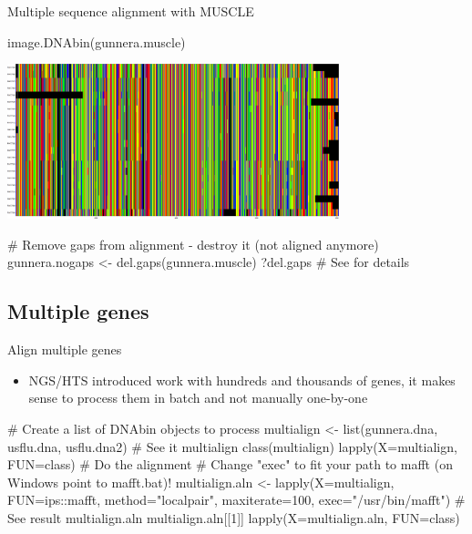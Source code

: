 \documentclass[compress, xelatex, 11pt, xcolor=svgnames, aspectratio=169,
	hyperref={
		bookmarks=true,
		unicode=true,
		colorlinks=true,
		pdftitle={Molecular data in R},
		plainpages=false,
		pdfauthor={Vojtech Zeisek},
		pdfsubject={Course about phylogeny and evolution in R},
		pdfcreator={XeLaTeX},
		pdfkeywords={R, evolution, phylogeny, molecular data},
		linkcolor=Crimson, %
		anchorcolor=Magenta, %
		citecolor=Magenta, %
		filecolor=Magenta, %
		menucolor=Magenta, %
		urlcolor=DodgerBlue, %
		},
	url={hyphens, lowtilde} %
	]{beamer}
\begin{document}
\begin{frame}[fragile]{Multiple sequence alignment with MUSCLE}
	\begin{spluscode}
    image.DNAbin(gunnera.muscle)
	\end{spluscode}
	\begin{center}
		\includegraphics[height=4.5cm]{muscle.png}
	\end{center}
	\begin{spluscode}
    # Remove gaps from alignment - destroy it (not aligned anymore)
    gunnera.nogaps <- del.gaps(gunnera.muscle)
    ?del.gaps # See for details
	\end{spluscode}
\end{frame}

\subsection{Multiple genes}

\begin{frame}[fragile]{Align multiple genes}
	\begin{itemize}
		\item NGS/HTS introduced work with hundreds and thousands of genes, it makes sense to process them in batch and not manually one-by-one
	\end{itemize}
	\begin{spluscode}
    # Create a list of DNAbin objects to process
    multialign <- list(gunnera.dna, usflu.dna, usflu.dna2)
    # See it
    multialign
    class(multialign)
    lapply(X=multialign, FUN=class)
    # Do the alignment
    # Change "exec" to fit your path to mafft (on Windows point to mafft.bat)!
    multialign.aln <- lapply(X=multialign, FUN=ips::mafft, method="localpair",
      maxiterate=100, exec="/usr/bin/mafft")
    # See result
    multialign.aln
    multialign.aln[[1]]
    lapply(X=multialign.aln, FUN=class)
	\end{spluscode}
\end{frame}
\end{document}
